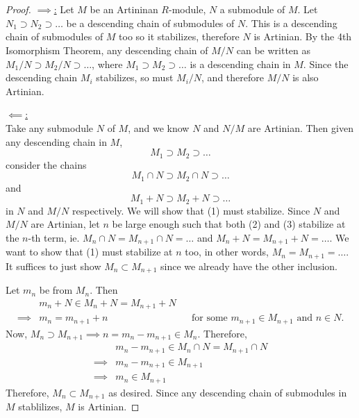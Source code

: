 \documentclass{article}
\theoremstyle{plain}
\begin{document}
\section{}
\begin{proof}
\underline{$\implies$:}
Let $M$ be an Artininan $R$-module, $N$ a submodule of $M$. Let $N_{1}\supset N_{2}\supset\ldots$
be a descending chain of submodules of $N$. This is a descending chain of
submodules of $M$ too so it stabilizes, therefore $N$ is Artinian. By the 4th
Isomorphism Theorem, any descending chain of $M/N$ can be written as
$M_{1}/N\supset M_{2}/N\supset\ldots$, where $M_{1}\supset M_{2}\supset\ldots$ is a descending chain in $M$. Since
the descending chain $M_{i}$ stabilizes, so must $M_{i}/N$, and therefore $M/N$
is also Artinian.

\underline{$\impliedby$:}
\\
Take any submodule $N$ of $M$, and we know $N$ and $N/M$ are Artinian. Then given
any descending chain in $M$,
\begin{equation}
M_{1}\supset M_{2}\supset\ldots
\end{equation}
consider the chains \begin{equation}
M_{1}\cap N\supset M_{2}\cap N\supset\ldots
\end{equation} and
\begin{equation}
M_{1}+ N\supset M_{2}+ N\supset\ldots
\end{equation} in $N$ and $M/N$ respectively. We will show that (1) must
stabilize. Since $N$ and $M/N$ are Artinian, let $n$ be large enough such that
both (2) and (3) stabilize at the $n$-th term, ie. $M_{n}\cap N=M_{n+1}\cap N=\ldots$ and
$M_{n}+ N=M_{n+1}+ N=\ldots$. We want to show that (1) must stabilize at $n$ too, in
other words, $M_{n}=M_{n+1}=\ldots$. It suffices to just show $M_{n} \subset M_{n+1}$ since
we already have the other inclusion. \medskip

Let $m_{n}$ be from $M_{n}$. Then
\begin{align*}
  &m_{n}+N\in M_{n}+N = M_{n+1} + N\\
  \implies& m_{n}=m_{n+1} + n&&\text{for some $m_{n+1}\in M_{n+1}$ and $n\in N$}.
\end{align*}
  Now, $M_{n}\supset M_{n+1}\implies n=m_{n}-m_{n+1}\in M_{n}$. Therefore,
  \begin{align*}
    &m_{n}-m_{n+1}\in M_{n}\cap N=M_{n+1}\cap N\\
    \implies&m_{n}-m_{n+1}\in M_{n+1}\\
    \implies&m_{n}\in M_{n+1}
  \end{align*}
  Therefore, $M_{n}\subset M_{n+1}$ as desired. Since any descending chain of
  submodules in $M$ stablilizes, $M$ is Artinian.\end{proof}
\end{document}

